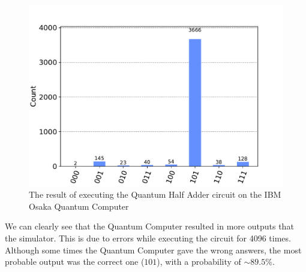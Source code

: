 \begin{figure}[!ht]
    \centering
    \includegraphics[scale=.5]{images/5_Implementation/half_adder_ibmq_result.pdf}
    \caption{The result of executing the Quantum Half Adder circuit on the IBM Osaka Quantum Computer}
\end{figure}

We can clearly see that the Quantum Computer resulted in more outputs that the simulator. This is due
to errors while executing the circuit for 4096 times. Although some times the Quantum Computer gave
the wrong answers, the most probable output was the correct one ($101$), with a probability of
$\sim 89.5\%$.